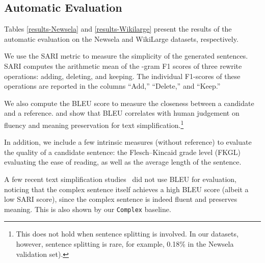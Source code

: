 \documentclass[11pt,a4paper]{article}
\begin{document}
\subsection{Automatic Evaluation}
\label{ss:results}


Tables \ref{results-Newsela} and \ref{results-Wikilarge} present the results of the automatic evaluation on the Newsela and WikiLarge datasets, respectively.


We use the SARI metric \cite{xu-etal-2016-optimizing} to measure the simplicity of the generated sentences. SARI computes the arithmetic mean of the -gram F1 scores of three rewrite operations: adding, deleting, and keeping. The individual F1-scores of these operations are reported in the columns ``Add,'' ``Delete,'' and ``Keep.''

We also compute the BLEU score \cite{papineni2002bleu} to measure the closeness between a candidate and a reference.  and  show that BLEU correlates with human judgement on fluency and meaning preservation for text simplification.\footnote{This does not hold when sentence splitting is involved. In our datasets, however, sentence splitting is rare, for example, 0.18\% in the Newsela validation set).}

In addition, we include a few intrinsic measures (without reference) to evaluate the quality of a candidate sentence: the Flesch--Kincaid grade level (FKGL) evaluating the ease of reading, as well as the average length of the sentence.

A few recent text simplification studies~\cite{dong2019editnts, kriz2019complexity} did not use BLEU for evaluation, noticing that the complex sentence itself achieves a high BLEU score (albeit a low SARI score), since the complex sentence is indeed fluent and preserves meaning. This is also shown by our {\tt Complex} baseline.
\end{document}
